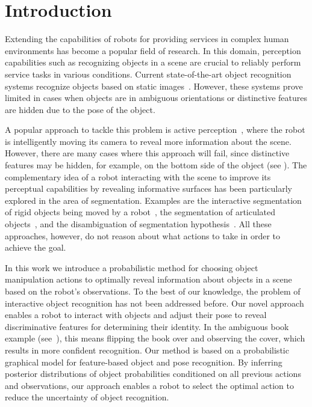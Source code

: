 
\section{Introduction}
    \vspace{-0.5ex}


Extending the capabilities of robots for providing services in complex human environments has become a popular field of research.
In this domain, perception capabilities such as recognizing objects in a scene are crucial to reliably perform service tasks in various conditions.
Current state-of-the-art object recognition systems recognize objects based on static images~\cite{tang2012textured,van2013fusing}.
However, these systems prove limited in cases when objects are in ambiguous orientations or distinctive features are hidden due to the pose of the object.

A popular approach to tackle this problem is active perception~\cite{atanasov2013hypothesis}, where the robot is intelligently moving its camera to reveal more information about the scene.
However, there are many cases where this approach will fail, since distinctive features may be hidden, for example, on the bottom side of the object (see ).
The complementary idea of a robot interacting with the scene to improve its perceptual capabilities by revealing informative surfaces has been particularly explored in the area of segmentation.
Examples are the interactive segmentation of rigid objects being moved by a robot~\cite{KenneyInteractive}, the segmentation of articulated objects~\cite{Katz-WS-MM-ICRA2011}, and the disambiguation of segmentation hypothesis~\cite{bergstrom11icvs}.
All these approaches, however, do not reason about what actions to take in order to achieve the goal.

In this work we introduce a probabilistic method for choosing object manipulation actions to optimally reveal information about objects in a scene based on the robot's observations.
To the best of our knowledge, the problem of interactive object recognition has not been addressed before. 
Our novel approach enables a robot to interact with objects and adjust their pose to reveal discriminative features for determining their identity.
In the ambiguous book example (see~), this means flipping the book over and observing the cover, which results in more confident recognition.
Our method is based on a probabilistic graphical model for feature-based object and pose recognition.
By inferring posterior distributions of object probabilities conditioned on all previous actions and observations, our approach enables a robot to select the optimal action to reduce the uncertainty of object recognition.

